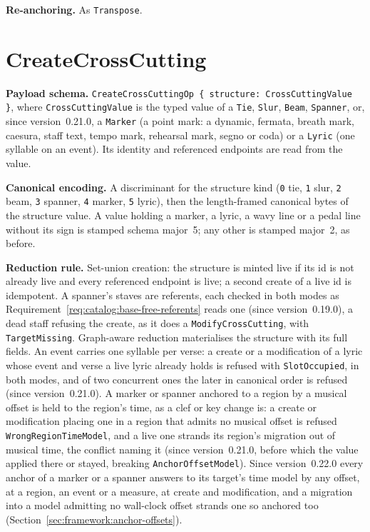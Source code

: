 \documentclass[11pt,letterpaper]{report}
\begin{document}
\textbf{Re-anchoring.} As \texttt{Transpose}.

\section{CreateCrossCutting}
\label{sec:k0:create-cross-cutting}

\textbf{Payload schema.} \texttt{CreateCrossCuttingOp \{ structure:
CrossCuttingValue \}}, where \texttt{CrossCuttingValue} is the typed value of a
\texttt{Tie}, \texttt{Slur}, \texttt{Beam}, \texttt{Spanner}, or, since
version~0.21.0, a \texttt{Marker} (a point mark: a dynamic, fermata, breath
mark, caesura, staff text, tempo mark, rehearsal mark, segno or coda) or a
\texttt{Lyric} (one syllable on an event). Its identity and
referenced endpoints are read from the value.

\textbf{Canonical encoding.} A discriminant for the structure kind
(\texttt{0} tie, \texttt{1} slur, \texttt{2} beam, \texttt{3} spanner,
\texttt{4} marker, \texttt{5} lyric), then the length-framed canonical bytes
of the structure value. A value holding a marker, a lyric, a wavy line or a
pedal line without its sign is stamped schema major~5; any other is stamped
major~2, as before.

\textbf{Reduction rule.} Set-union creation: the structure is minted live if its
id is not already live and every referenced endpoint is live; a second create of
a live id is idempotent. A spanner's staves are referents, each checked in both
modes as Requirement~\ref{req:catalog:base-free-referents} reads one (since
version~0.19.0), a dead staff refusing the create, as it does a
\texttt{ModifyCrossCutting}, with \texttt{TargetMissing}. Graph-aware reduction materialises the structure with
its full fields. An event carries one syllable per verse: a create or a
modification of a lyric whose event and verse a live lyric already holds is
refused with \texttt{SlotOccupied}, in both modes, and of two concurrent
ones the later in canonical order is refused (since version~0.21.0). A
marker or spanner anchored to a region by a musical offset is held to the
region's time, as a clef or key change is: a create or modification placing
one in a region that admits no musical offset is refused
\texttt{WrongRegionTimeModel}, and a live one strands its region's migration
out of musical time, the conflict naming it (since version~0.21.0, before
which the value applied there or stayed, breaking \texttt{AnchorOffsetModel}).
Since version~0.22.0 every anchor of a marker or a spanner answers to its
target's time model by any offset, at a region, an event or a measure, at
create and modification, and a migration into a model admitting no wall-clock
offset strands one so anchored too (Section~\ref{sec:framework:anchor-offsets}).
\end{document}
